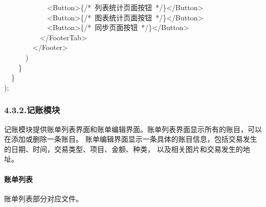 \documentclass{article}
\begin{document}
\begin{mdpre}
~~~~~~~~~~~~\textless{}Button\textgreater{}\{{/*}{~列表统计页面按钮~}{*/}\}\textless{}/Button\textgreater{}\\
~~~~~~~~~~~~\textless{}Button\textgreater{}\{{/*}{~图表统计页面按钮~}{*/}\}\textless{}/Button\textgreater{}\\
~~~~~~~~~~~~\textless{}Button\textgreater{}\{{/*}{~同步页面按钮~}{*/}\}\textless{}/Button\textgreater{}\\
~~~~~~~~~~\textless{}/FooterTab\textgreater{}\\
~~~~~~~~\textless{}/Footer\textgreater{}\\
~~~~~~)\\
~~~~\}\\
~~\}\\
);%
\end{mdpre}
\subsubsection{4.3.2.\hspace*{0.5em}记账模块}\label{section}%

\noindent{}记账模块提供账单列表界面和账单编辑界面。账单列表界面显示所有的账目，可以在添加或删除一条账目。
账单编辑界面显示一条具体的账目信息，包括交易发生的日期、时间，交易类型、项目、金额、种类，
以及相关图片和交易发生的地址。%

\paragraph{账单列表}\label{section}%

\noindent{}账单列表部分对应文件。%
\end{document}
